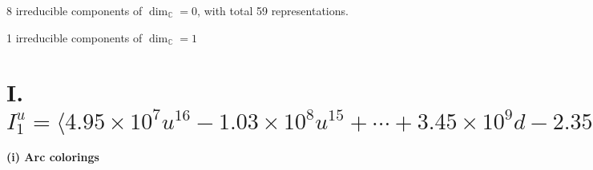 \documentclass[1p]{elsarticle_modified}
\theoremstyle{definition}
\begin{document}
\raggedright * 8 irreducible components of $\dim_{\mathbb{C}}=0$, with total 59 representations.\\
\raggedright * 1 irreducible components of $\dim_{\mathbb{C}}=1$ \\
\newpage
\renewcommand{\arraystretch}{1}
\centering \section*{I. $I^u_{1}= \langle 4.95\times10^{7} u^{16}-1.03\times10^{8} u^{15}+\cdots+3.45\times10^{9} d-2.35\times10^{8},\;5.85\times10^{7} u^{16}-2.70\times10^{8} u^{15}+\cdots+1.38\times10^{10} c-1.43\times10^{10},\;3.13\times10^{7} u^{16}-4.24\times10^{8} u^{15}+\cdots+6.90\times10^{9} b-2.52\times10^{9},\;6.30\times10^{8} u^{16}-1.20\times10^{9} u^{15}+\cdots+1.38\times10^{10} a-1.86\times10^{10},\;u^{17}-2 u^{16}+\cdots-4 u^2+8 \rangle$}
\flushleft \textbf{(i) Arc colorings}\\
\end{document}
